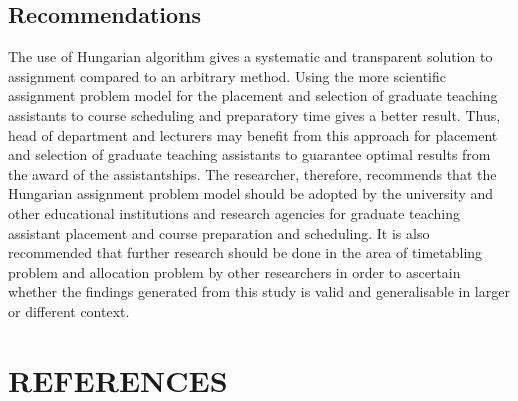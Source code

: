 \documentclass[11pt]{report}
\begin{document}
	\section{Recommendations}
	The use of Hungarian algorithm gives a systematic and transparent solution to assignment compared to an arbitrary method. Using the more scientific assignment problem model for the placement and selection of graduate teaching assistants to course scheduling and preparatory time gives a better result. Thus, head of department and lecturers may benefit from this approach for placement and selection of graduate teaching assistants to guarantee optimal results from the award of the assistantships. The researcher, therefore, recommends that the Hungarian assignment problem model should be adopted by the university and other educational institutions and research
	agencies for graduate teaching assistant placement and course preparation and scheduling. It is also recommended that further research should be done in the area of timetabling problem and allocation problem by other researchers in order to ascertain whether the findings generated from this study is valid and generalisable in larger or different context.
	
	
	\chapter*{REFERENCES}
	
\end{document}
